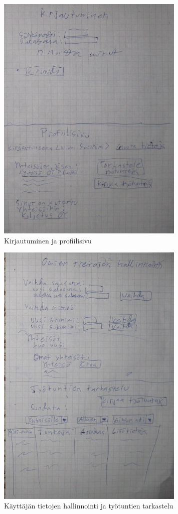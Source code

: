 \documentclass[a4paper, 12pt finnish]{article}
\begin{document}
\begin{figure}[htbp]
    \centering
    \includegraphics[width=0.8\textwidth]{kirjautuminen.png}
    \caption{\small Kirjautuminen ja profiilisivu}
\end{figure}
\begin{figure}[htbp]
    \centering
    \includegraphics[width=0.8\textwidth]{omattiedot.png}
    \caption{\small Käyttäjän tietojen hallinnointi ja työtuntien
    tarkastelu}
\end{figure}
\end{document}
